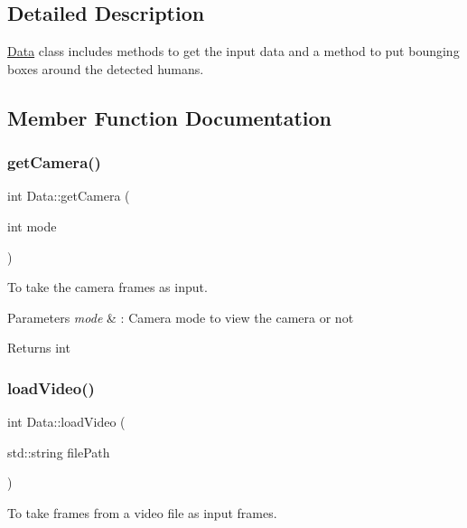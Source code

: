 \subsection{Detailed Description}
\hyperlink{classData}{Data} class includes methods to get the input data and a method to put bounging boxes around the detected humans. 

\subsection{Member Function Documentation}
\mbox{\label{classData_a511184f11597e720b0bf96b9b4f89a0b}} 
\subsubsection{\texorpdfstring{get\+Camera()}{getCamera()}}
{\footnotesize\ttfamily int Data\+::get\+Camera (\begin{DoxyParamCaption}\item[{int}]{mode }\end{DoxyParamCaption})}



To take the camera frames as input. 


\begin{DoxyParams}{Parameters}
{\em mode} & \+: Camera mode to view the camera or not \\
\hline
\end{DoxyParams}
\begin{DoxyReturn}{Returns}
int 
\end{DoxyReturn}
\mbox{\label{classData_ae02b7e6ada4f27a9edccc577e42bba99}} 
\subsubsection{\texorpdfstring{load\+Video()}{loadVideo()}}
{\footnotesize\ttfamily int Data\+::load\+Video (\begin{DoxyParamCaption}\item[{std\+::string}]{file\+Path }\end{DoxyParamCaption})}



To take frames from a video file as input frames. 



